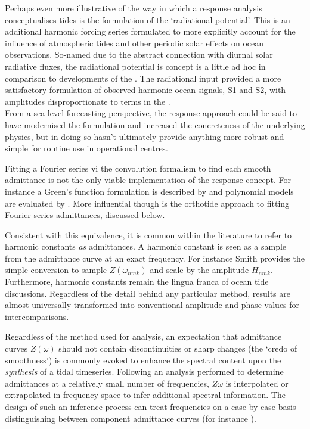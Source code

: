 Perhaps even more illustrative of the way in which a response analysis conceptualises tides is the formulation of the `radiational potential'.   This is an additional harmonic forcing series formulated to more explicitly account for the influence of atmospheric tides and other periodic solar effects on ocean observations.	  So-named due to the abstract connection with diurnal solar radiative fluxes, the radiational potential is concept is a little ad hoc in comparison to developments of the \ATGP{}.  The radiational input provided a more satisfactory formulation of observed harmonic ocean signals, S1 and S2, with amplitudes disproportionate to terms in the \ATGP{}.\\
From a sea level forecasting perspective, the response approach could be said to have modernised the formulation and increased the concreteness of the underlying physics, but in doing so hasn't ultimately provide anything more robust and simple for routine use in operational centres.


Fitting a Fourier series vi the convolution formalism to find each smooth admittance is not the only viable implementation of the response concept.  For instance a Green's function formulation is described by \citet{Webb:1974ke} and polynomial models are evaluated by \citet{Desai:1995je}. More influential though is the orthotide approach to fitting Fourier series admittances, discussed below.



Consistent with this equivalence, it is common within the literature to refer to harmonic constants \emph{as} admittances.   A harmonic constant is seen as a sample from the admittance curve at an exact frequency. For instance Smith\cite{Smith:1997ut} provides the simple conversion to sample $Z(\omega_{nmk})$ and scale by the \ATGP{} amplitude $H_{nmk}$.
Furthermore, harmonic constants remain the lingua franca of ocean tide discussions. Regardless of the detail behind any particular method, results are almost universally transformed into conventional amplitude and phase values for intercomparisons.


Regardless of the method used for analysis, an expectation that admittance curves $Z(\omega)$ should not contain discontinuities or sharp changes (the `credo of smoothness') is commonly evoked to enhance the spectral content upon the \emph{synthesis} of a tidal timeseries.  Following an analysis performed to determine admittances at a relatively small number of frequencies, $Z{\omega}$ is interpolated or extrapolated in frequency-space to infer additional spectral information.   The design of such an inference process can treat frequencies on a case-by-case basis distinguishing between component admittance curves (for instance \citep[pp 268]{Fu:2001ub}).




